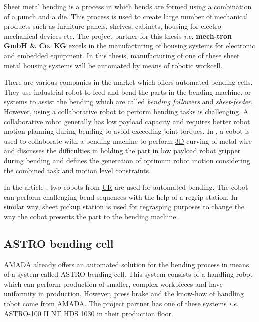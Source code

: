 Sheet metal bending is a process in which bends are formed using a combination of a punch and a die. This process is used to create large number of mechanical products such as furniture panels, shelves, cabinets, housing for electro-mechanical devices etc. \cite{alvaautomated}
The project partner for this thesis \textit{i.e.} \textbf{mech-tron GmbH \& Co. KG} excels in the manufacturing of housing systems for electronic and embedded equipment. In this thesis, manufacturing of one of these sheet metal housing systems will be automated by means of robotic workcell.


There are various companies in the market which offers automated bending cells. They use industrial robot to feed and bend the parts in the bending machine. \cite{mekoprint, shenchong, shopmetal} or systems to assist the bending which are called \textit{bending followers} and \textit{sheet-feeder}. \cite{guimaraes2009bending} However, using a collaborative robot to perform bending tasks is challenging. A collaborative robot generally has low payload capacity and requires better robot motion planning during bending to avoid exceeding joint torques.
In \cite{liu2022metalwiremanipulationplanning}, a cobot is used to collaborate with a bending machine to perform \hyperref[acro:3D]{3D} curving of metal wire and discusses the difficulties in holding the
part in low payload robot gripper during bending and defines the generation of optimum robot motion considering the combined task and motion level constraints.

In the article \cite{cobotfabricator}, two cobots from \hyperref[acro:UR]{UR} are used for automated bending. The cobot can perform challenging bend sequences with the help of a regrip station. In similar way, sheet pickup station is used for regrasping purposes to change the way the cobot presents the part to the bending machine.

\subsection{ASTRO bending cell}
\label{subsec:astro}

\hyperref[acro:AMADA]{AMADA} already offers an automated solution for the bending process in means of a system called ASTRO bending cell. This system consists of a handling robot which can perform production of smaller, complex workpieces and have uniformity in production. However, press brake and the know-how of handling robot come from \hyperref[acro:AMADA]{AMADA}.
The project partner has one of these systems \textit{i.e.} ASTRO-100 II NT HDS 1030 in their production floor. 


